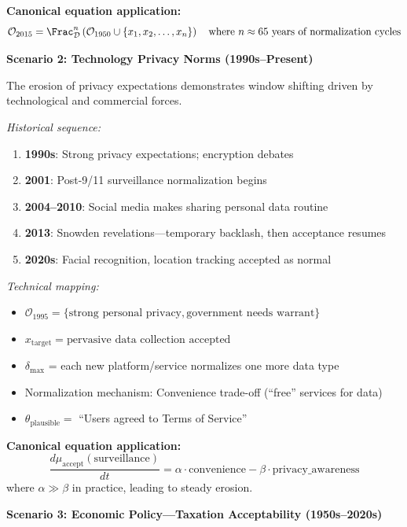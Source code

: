 \begin{tcolorbox}[colback=yellow!5!white,colframe=yellow!65!black,title=\textbf{Real-Life Scenarios: Overton Window Shifts},breakable]
\textbf{Canonical equation application:}
\[
    \mathcal{O}_{2015} = \Frac_{\mathcal{D}}^{n}\left( \mathcal{O}_{1950} \cup
    \{x_1, x_2, \ldots, x_n\} \right)
    \quad \text{where } n \approx 65 \text{ years of normalization cycles}
\]

\hrulefill

\textbf{Scenario 2: Technology Privacy Norms (1990s--Present)}

The erosion of privacy expectations demonstrates window shifting driven by
technological and commercial forces.

\textit{Historical sequence:}
\begin{enumerate}
    \item \textbf{1990s}: Strong privacy expectations; encryption debates
    \item \textbf{2001}: Post-9/11 surveillance normalization begins
    \item \textbf{2004--2010}: Social media makes sharing personal data routine
    \item \textbf{2013}: Snowden revelations---temporary backlash, then acceptance resumes
    \item \textbf{2020s}: Facial recognition, location tracking accepted as normal
\end{enumerate}

\textit{Technical mapping:}
\begin{itemize}
    \item $\mathcal{O}_{1995} = \{\text{strong personal privacy},
          \text{government needs warrant}\}$
    \item $x_{\mathrm{target}} = \text{pervasive data collection accepted}$
    \item $\delta_{\max}$ = each new platform/service normalizes one more data type
    \item Normalization mechanism: Convenience trade-off (``free'' services for data)
    \item $\theta_{\mathrm{plausible}} =$ ``Users agreed to Terms of Service''
\end{itemize}

\textbf{Canonical equation application:}
\[
    \frac{d\mu_{\mathrm{accept}}(\text{surveillance})}{dt} =
    \alpha \cdot \mathrm{convenience} - \beta \cdot \mathrm{privacy\_awareness}
\]
where $\alpha \gg \beta$ in practice, leading to steady erosion.

\hrulefill

\textbf{Scenario 3: Economic Policy---Taxation Acceptability (1950s--2020s)}


\end{tcolorbox}
